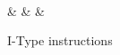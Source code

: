 \begin{figure}[h]
	\centering
	\begin{bytefield}[bitwidth=0.03\linewidth]{32}
		 \\
		 &
		 &
		 &
	\end{bytefield}

	\caption{I-Type instructions}
	\label{fig:itype_format}
\end{figure}
